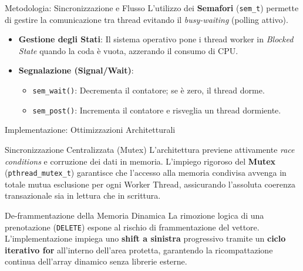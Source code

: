 \documentclass[aspectratio=169, 10pt]{beamer}
\begin{document}
\begin{frame}{Metodologia: Sincronizzazione e Flusso}
    L'utilizzo dei \textbf{Semafori} (\texttt{sem\_t}) permette di gestire la comunicazione tra thread evitando il \textit{busy-waiting} (polling attivo).
    
    \begin{itemize}
        \item \textbf{Gestione degli Stati}: Il sistema operativo pone i thread worker in \textit{Blocked State} quando la coda è vuota, azzerando il consumo di CPU.
        \item \textbf{Segnalazione (Signal/Wait)}: 
            \begin{itemize}
                \item \texttt{sem\_wait()}: Decrementa il contatore; se è zero, il thread dorme.
                \item \texttt{sem\_post()}: Incrementa il contatore e risveglia un thread dormiente.
            \end{itemize}
    \end{itemize}
\end{frame}


\begin{frame}{Implementazione: Ottimizzazioni Architetturali}
    \begin{block}{Sincronizzazione Centralizzata (Mutex)}
        L'architettura previene attivamente \textit{race conditions} e corruzione dei dati in memoria.
        L'impiego rigoroso del \textbf{Mutex} (\texttt{pthread\_mutex\_t}) garantisce che l'accesso alla memoria condivisa avvenga in totale mutua esclusione per ogni Worker Thread, assicurando l'assoluta coerenza transazionale sia in lettura che in scrittura.
    \end{block}
    
    \vspace{0.3cm}
    
    \begin{block}{De-frammentazione della Memoria Dinamica}
        La rimozione logica di una prenotazione (\texttt{DELETE}) espone al rischio di frammentazione del vettore.
        L'implementazione impiega uno \textbf{shift a sinistra} progressivo tramite un \textbf{ciclo iterativo for} all'interno dell'area protetta, garantendo la ricompattazione continua dell'array dinamico senza librerie esterne.
    \end{block}
\end{frame}
\end{document}
